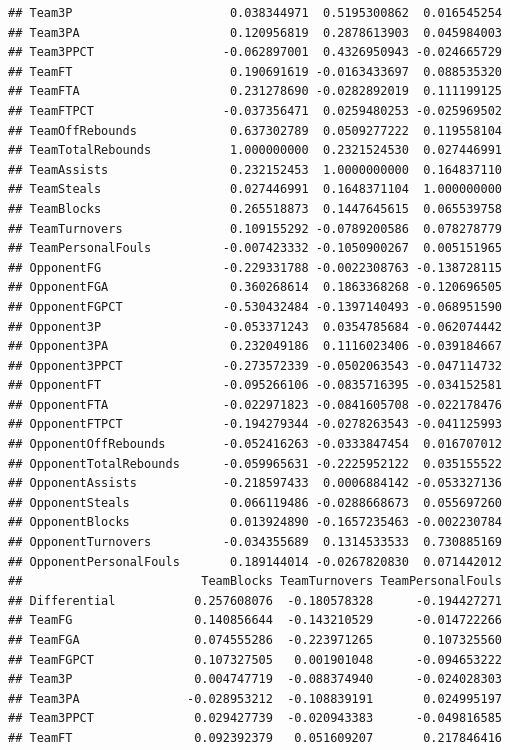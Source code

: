 \documentclass[]{book}
\begin{document}
\begin{verbatim}
## Team3P                      0.038344971  0.5195300862  0.016545254
## Team3PA                     0.120956819  0.2878613903  0.045984003
## Team3PPCT                  -0.062897001  0.4326950943 -0.024665729
## TeamFT                      0.190691619 -0.0163433697  0.088535320
## TeamFTA                     0.231278690 -0.0282892019  0.111199125
## TeamFTPCT                  -0.037356471  0.0259480253 -0.025969502
## TeamOffRebounds             0.637302789  0.0509277222  0.119558104
## TeamTotalRebounds           1.000000000  0.2321524530  0.027446991
## TeamAssists                 0.232152453  1.0000000000  0.164837110
## TeamSteals                  0.027446991  0.1648371104  1.000000000
## TeamBlocks                  0.265518873  0.1447645615  0.065539758
## TeamTurnovers               0.109155292 -0.0789200586  0.078278779
## TeamPersonalFouls          -0.007423332 -0.1050900267  0.005151965
## OpponentFG                 -0.229331788 -0.0022308763 -0.138728115
## OpponentFGA                 0.360268614  0.1863368268 -0.120696505
## OpponentFGPCT              -0.530432484 -0.1397140493 -0.068951590
## Opponent3P                 -0.053371243  0.0354785684 -0.062074442
## Opponent3PA                 0.232049186  0.1116023406 -0.039184667
## Opponent3PPCT              -0.273572339 -0.0502063543 -0.047114732
## OpponentFT                 -0.095266106 -0.0835716395 -0.034152581
## OpponentFTA                -0.022971823 -0.0841605708 -0.022178476
## OpponentFTPCT              -0.194279344 -0.0278263543 -0.041125993
## OpponentOffRebounds        -0.052416263 -0.0333847454  0.016707012
## OpponentTotalRebounds      -0.059965631 -0.2225952122  0.035155522
## OpponentAssists            -0.218597433  0.0006884142 -0.053327136
## OpponentSteals              0.066119486 -0.0288668673  0.055697260
## OpponentBlocks              0.013924890 -0.1657235463 -0.002230784
## OpponentTurnovers          -0.034355689  0.1314533533  0.730885169
## OpponentPersonalFouls       0.189144014 -0.0267820830  0.071442012
##                         TeamBlocks TeamTurnovers TeamPersonalFouls
## Differential           0.257608076  -0.180578328      -0.194427271
## TeamFG                 0.140856644  -0.143210529      -0.014722266
## TeamFGA                0.074555286  -0.223971265       0.107325560
## TeamFGPCT              0.107327505   0.001901048      -0.094653222
## Team3P                 0.004747719  -0.088374940      -0.024028303
## Team3PA               -0.028953212  -0.108839191       0.024995197
## Team3PPCT              0.029427739  -0.020943383      -0.049816585
## TeamFT                 0.092392379   0.051609207       0.217846416

\end{verbatim}
\end{document}
